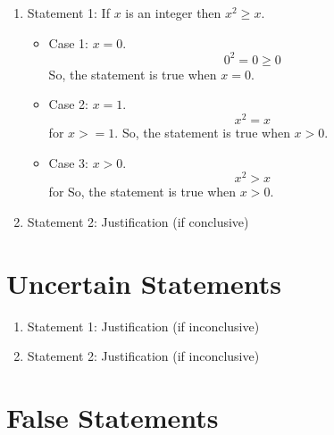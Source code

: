 \documentclass{article}
\begin{document}
\begin{enumerate}
    \item Statement 1: If $x$ is an integer then $x^2 \geq x$.\newline
          \begin{itemize}
              \item Case 1: $x = 0$.
                    \[0^2 = 0 \geq 0\]
                    So, the statement is true when $x = 0$.
              \item Case 2: $x = 1$.
                    \[x^2 = x\] for $x >= 1$.
                    So, the statement is true when $x > 0$.
              \item Case 3: $x > 0$.
                    \[x^2 > x\] for
                    So, the statement is true when $x > 0$.
          \end{itemize}
    \item Statement 2: Justification (if conclusive)
\end{enumerate}

\section{Uncertain Statements}

\begin{enumerate}
    \item Statement 1: Justification (if inconclusive)
    \item Statement 2: Justification (if inconclusive)
\end{enumerate}

\section{False Statements}
\end{document}
